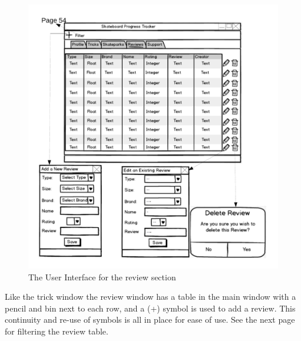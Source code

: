 \begin{figure}[H]
    \includegraphics[width=\textwidth]{./Design/ReviewsUI.pdf}
    \caption{The User Interface for the review section} \label{fig:Review User Interface}
\end{figure}

Like the trick window the review window has a table in the main window with a pencil and bin next to each row, and a (+) symbol is used to add a review. This continuity and re-use of symbols is all in place for ease of use. See the next page for filtering the review table.


